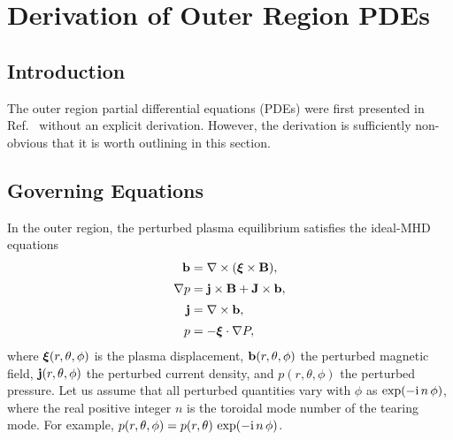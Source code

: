 \documentclass[12pt,prb,aps]{revtex4-1}
\newcommand {\bxi}{\mbox{\boldmath$\xi$}}
\begin{document}
\section{Derivation of Outer Region PDEs}
\subsection{Introduction}
The outer region partial differential equations (PDEs) were first presented in Ref.~ without an explicit
derivation. However, the derivation is sufficiently non-obvious that it is worth outlining in this section. 

\subsection{Governing Equations}
In the outer region, the perturbed plasma equilibrium satisfies the  ideal-MHD equations\,\cite{connor,am1,am3,gs1}
\begin{align}
{\bf b} &= \nabla\times (\bxi\times {\bf B}),\label{e21}\\[0.5ex]
\nabla p &={\bf j}\times {\bf B}  +{\bf J}\times {\bf b},\label{e22}\\[0.5ex]
{\bf j} &= \nabla\times {\bf b},\label{e23}\\[0.5ex]
p&= -\bxi\cdot\nabla P,\label{e24}
\end{align}
where $\bxi(r,\theta,\phi)$ is the plasma displacement, ${\bf b}(r,\theta,\phi)$ the perturbed magnetic field,
${\bf j}(r,\theta,\phi)$ the perturbed current density, and $p(r,\theta,\phi)$ the perturbed pressure. 
Let us assume that all perturbed quantities vary with $\phi$ as $\exp(-{\rm i}\,n\,\phi)$, where the real positive integer $n$ is the
toroidal mode number of the tearing mode. For example, $p(r,\theta,\phi) = p(r,\theta)\,\exp(-{\rm i}\,n\,\phi)$. 
\end{document}
